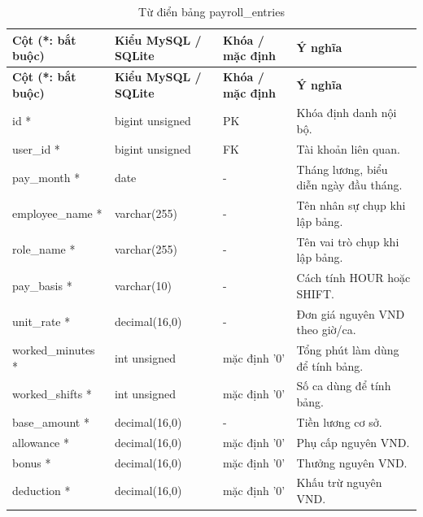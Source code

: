 {\fontsize{10}{12}\selectfont\setlength{\tabcolsep}{3pt}\renewcommand{\arraystretch}{1.12}
\begin{longtable}{@{}L{\textwidth-4.86pt\relax} L{\textwidth-3.96pt\relax} L{\textwidth-2.88pt\relax} L{\textwidth-6.3pt\relax}@{}}
\caption{Từ điển bảng payroll\_\allowbreak{}entries}\\
\toprule
\textbf{Cột (*:\allowbreak{} bắt buộc)} & \textbf{Kiểu My\allowbreak{}SQL /\allowbreak{} SQLite} & \textbf{Khóa /\allowbreak{} mặc định} & \textbf{Ý nghĩa}\\\midrule
\endfirsthead
\toprule
\textbf{Cột (*:\allowbreak{} bắt buộc)} & \textbf{Kiểu My\allowbreak{}SQL /\allowbreak{} SQLite} & \textbf{Khóa /\allowbreak{} mặc định} & \textbf{Ý nghĩa}\\\midrule
\endhead
\bottomrule\endlastfoot
id * & bigint unsigned & PK & Khóa định danh nội bộ.\allowbreak{}\\[1pt]
user\_\allowbreak{}id * & bigint unsigned & FK & Tài khoản liên quan.\allowbreak{}\\[1pt]
pay\_\allowbreak{}month * & date & - & Tháng lương, biểu diễn ngày đầu tháng.\allowbreak{}\\[1pt]
employee\_\allowbreak{}name * & varchar(255) & - & Tên nhân sự chụp khi lập bảng.\allowbreak{}\\[1pt]
role\_\allowbreak{}name * & varchar(255) & - & Tên vai trò chụp khi lập bảng.\allowbreak{}\\[1pt]
pay\_\allowbreak{}basis * & varchar(10) & - & Cách tính HOUR hoặc SHIFT.\allowbreak{}\\[1pt]
unit\_\allowbreak{}rate * & decimal(16,0) & - & Đơn giá nguyên VND theo giờ/\allowbreak{}ca.\allowbreak{}\\[1pt]
worked\_\allowbreak{}minutes * & int unsigned & mặc định '0' & Tổng phút làm dùng để tính bảng.\allowbreak{}\\[1pt]
worked\_\allowbreak{}shifts * & int unsigned & mặc định '0' & Số ca dùng để tính bảng.\allowbreak{}\\[1pt]
base\_\allowbreak{}amount * & decimal(16,0) & - & Tiền lương cơ sở.\allowbreak{}\\[1pt]
allowance * & decimal(16,0) & mặc định '0' & Phụ cấp nguyên VND.\allowbreak{}\\[1pt]
bonus * & decimal(16,0) & mặc định '0' & Thưởng nguyên VND.\allowbreak{}\\[1pt]
deduction * & decimal(16,0) & mặc định '0' & Khấu trừ nguyên VND.\allowbreak{}\\[1pt]

\end{longtable}}
